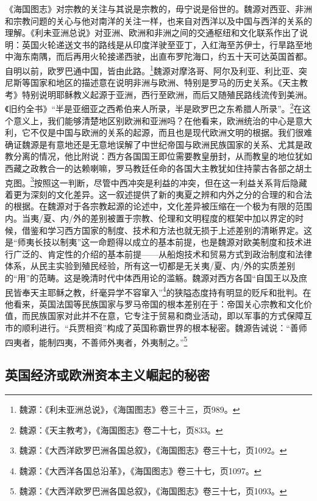 \documentclass[a4paper, 12pt, openright]{ctexbook}
\begin{document}
《海国图志》对宗教的关注与其说是宗教的，毋宁说是俗世的。魏源对西亚、非洲和宗教问题的关心与他对南洋的关注一样，也来自对西洋以及中国与西洋的关系的理解。《利未亚洲总说》对亚洲、欧洲和非洲之间的交通枢纽和文化联系作出了说明：英国火轮递送文书的路线是从印度洋驶至亚丁，入红海至苏伊士，行旱路至地中海东南隅，而后再用火轮接递西驶，出直布罗陀海口，约五十天可达英国首都。自明以前，欧罗巴通中国，皆由此路。\footnote{魏源：《利未亚洲总说》，《海国图志》卷三十三，页989。}魏源对摩洛哥、阿尔及利亚、利比亚、突尼斯等国家和地区的描述意在说明非洲与欧洲、特别是罗马的历史关系。《天主教考》特别说明耶稣教义起源于亚洲，西行至欧洲，而后又随殖民路线流传到美洲。《旧约全书》“半是亚细亚之西希伯来人所录，半是欧罗巴之东希腊人所录”。\footnote{魏源：《天主教考》，《海国图志》卷二十七，页833。}在这个意义上，我们能够清楚地区别欧洲和亚洲吗？在他看来，欧洲统治的中心是意大利，它不仅是中国与欧洲的关系的起源，而且也是现代欧洲文明的根据。我们很难确证魏源是有意地还是无意地误解了中世纪帝国与欧洲民族国家的关系、尤其是政教分离的情况，他比附说：西方各国国王即位需要教皇册封，从而教皇的地位犹如西藏之政教合一的达赖喇嘛，罗马教廷任命的各国大主教犹如住持蒙古各部之胡土克图。\footnote{魏源：《大西洋欧罗巴洲各国总叙》，《海国图志》卷三十七，页1092。}按照这一判断，尽管中西冲突是利益的冲突，但在这一利益关系背后隐藏着更为深刻的文化差异。这一叙述提供了新的夷夏之辨和内外之分的合理的和合法的根据。在魏源对于各宗教起源的论述中，文化差异被压缩在一个极为有限的范围内。当夷/夏、内/外的差别被置于宗教、伦理和文明程度的框架中加以界定的时候，借鉴和学习西方国家的制度、技术和方法也就无损于上述差别的清晰界定。这是“师夷长技以制夷”这一命题得以成立的基本前提，也是魏源对欧美制度和技术进行广泛的、肯定性的介绍的基本前提——从船炮技术和贸易方式到政治制度和法律体系，从民主实验到殖民经验，所有这一切都是无关夷/夏、内/外的实质差别的“用”的范畴。这是晚清时代中体西用论的滥觞。魏源对西方各国“自国王以及庶民皆奉天主耶稣之教，纤毫异学不容窜入”\footnote{魏源：《大西洋各国总沿革》，《海国图志》卷三十七，页1097。}的狭隘态度持有明显的贬斥和批判。在他看来，英国法国等民族国家与罗马帝国的根本差别在于：帝国关心宗教和文化价值，而民族国家对此并不在意，它专注于贸易和商业活动，即以军事的方式保障互市的顺利进行。“兵贾相资”构成了英国称霸世界的根本秘密。魏源告诫说：“善师四夷者，能制四夷，不善师外夷者，外夷制之。”\footnote{魏源：《大西洋欧罗巴洲各国总叙》，《海国图志》卷三十七，页1093。}

\subsection{英国经济或欧洲资本主义崛起的秘密}
\end{document}
